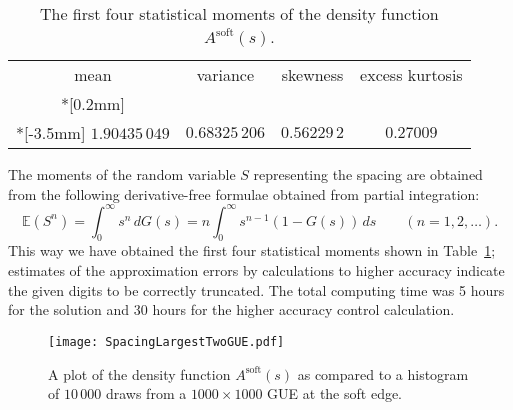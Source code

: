 \documentclass[10pt,reqno]{amsart}
\theoremstyle{plain}
\theoremstyle{definition}
\theoremstyle{remark}
\begin{document}
\begin{table}[tbp]
\caption{\small The first four statistical moments of the density function $A^\text{soft}(s)$.}\label{table:moments}
{\small
\begin{tabular}{cccc}
mean & variance & skewness & excess kurtosis \\*[0.2mm]\hline\\*[-3.5mm]
$1.90435\,049$  &  $0.68325\,206$  &  $0.56229\,2$  &  $0.27009$
\end{tabular}}
\end{table}

The moments of the random variable $S$ representing the spacing are obtained from the following derivative-free 
formulae obtained from partial integration:
\[
{\mathbb{E}}(S^n) = \int_0^\infty s^n \,d G(s) =  n\int_0^\infty s^{n-1} (1-G(s))\,ds\qquad (n=1,2,\ldots).
\]
This way we have obtained the first four statistical moments shown in Table~\ref{table:moments}; estimates
of the approximation errors by calculations to higher accuracy indicate the given digits to be correctly truncated.
The total computing time was 5 hours for the solution and 30 hours for the higher accuracy control calculation.

\begin{figure}[tbp]
\begin{center}
{\texttt{[image: SpacingLargestTwoGUE.pdf]}}
\end{center}
\caption{\small A plot of the density function $A^\text{soft}(s)$ as compared to a histogram of $10\,000$ draws 
from a $1000\times 1000$ GUE at the soft edge.} 
\label{fig:1}
\end{figure}
\end{document}
